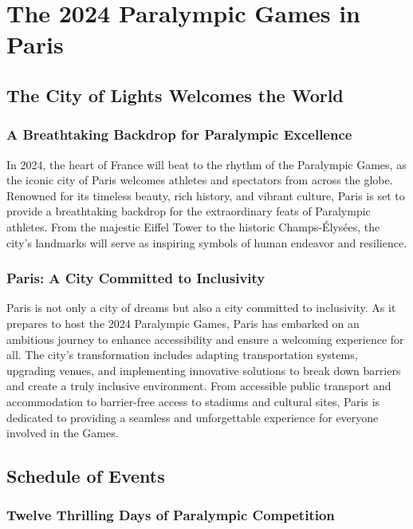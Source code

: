 \chapter{The 2024 Paralympic Games in Paris}

\section{The City of Lights Welcomes the World}

\subsection{A Breathtaking Backdrop for Paralympic Excellence}
In 2024, the heart of France will beat to the rhythm of the Paralympic Games, as the iconic city of Paris welcomes athletes and spectators from across the globe. Renowned for its timeless beauty, rich history, and vibrant culture, Paris is set to provide a breathtaking backdrop for the extraordinary feats of Paralympic athletes. From the majestic Eiffel Tower to the historic Champs-Élysées, the city's landmarks will serve as inspiring symbols of human endeavor and resilience.

\subsection{Paris: A City Committed to Inclusivity}

Paris is not only a city of dreams but also a city committed to inclusivity. As it prepares to host the 2024 Paralympic Games, Paris has embarked on an ambitious journey to enhance accessibility and ensure a welcoming experience for all. The city's transformation includes adapting transportation systems, upgrading venues, and implementing innovative solutions to break down barriers and create a truly inclusive environment. From accessible public transport and accommodation to barrier-free access to stadiums and cultural sites, Paris is dedicated to providing a seamless and unforgettable experience for everyone involved in the Games.

\section{Schedule of Events}

\subsection{Twelve Thrilling Days of Paralympic Competition}

